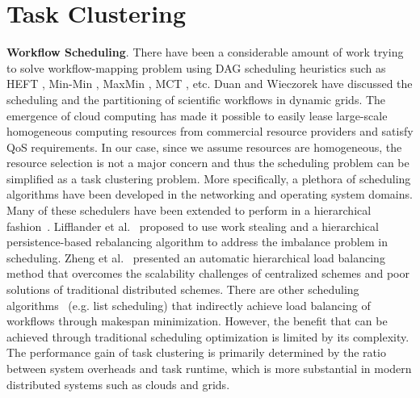 \section{Task Clustering}

\textbf{Workflow Scheduling}. There have been a considerable amount of work trying to solve workflow-mapping problem using DAG scheduling heuristics such as HEFT \cite{Topcuoglu2002}, Min-Min \cite{Blythe2005}, MaxMin \cite{Braun2001}, MCT \cite{Braun2001}, etc. Duan \cite{Rubing2005} and Wieczorek \cite{Wieczorek2005} have discussed the scheduling and the partitioning of scientific workflows in dynamic grids. The emergence of cloud computing \cite{Armbrust2009} has made it possible to easily lease large-scale homogeneous computing resources from commercial resource providers and satisfy QoS requirements. In our case, since we assume resources are homogeneous, the resource selection is not a major concern and thus the scheduling problem can be simplified as a task clustering problem. 
More specifically, a plethora of  scheduling algorithms have been developed in the networking and operating system domains. Many of these schedulers have been extended to perform in a hierarchical fashion~\cite{Lifflander2012}. Lifflander et al.~\cite{Lifflander2012} proposed to use work stealing and a hierarchical persistence-based rebalancing algorithm to address the imbalance problem in scheduling. Zheng et al.~\cite{Zheng2011} presented an automatic hierarchical load balancing method that overcomes the scalability challenges of centralized schemes and poor solutions of traditional distributed schemes. There are other scheduling algorithms~\cite{Braun2001} (e.g. list scheduling) that indirectly achieve load balancing of workflows through makespan minimization. However, the benefit that can be achieved through traditional scheduling optimization is limited by its complexity. The performance gain of task clustering is primarily determined by the ratio between system overheads and task runtime, which is more substantial in modern distributed systems such as clouds and grids. 

